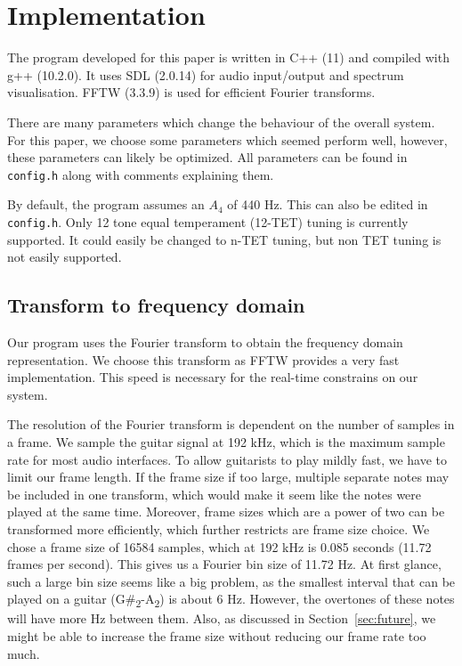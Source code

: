 \documentclass[10pt,twocolumn]{article}
\begin{document}
\section{Implementation}  \label{sec:impl}
The program developed for this paper is written in C++ (11) and compiled with g++ (10.2.0). It uses SDL (2.0.14) for audio input/output and spectrum visualisation. FFTW (3.3.9) is used for efficient Fourier transforms.

There are many parameters which change the behaviour of the overall system. For this paper, we choose some parameters which seemed perform well, however, these parameters can likely be optimized. All parameters can be found in \texttt{config.h} along with comments explaining them.

By default, the program assumes an $A_4$ of 440 Hz. This can also be edited in \texttt{config.h}. Only 12 tone equal temperament (12-TET) tuning is currently supported. It could easily be changed to n-TET tuning, but non TET tuning is not easily supported.

\subsection{Transform to frequency domain}  \label{sub:four}
Our program uses the Fourier transform to obtain the frequency domain representation. We choose this transform as FFTW provides a very fast implementation. This speed is necessary for the real-time constrains on our system.

The resolution of the Fourier transform is dependent on the number of samples in a frame. We sample the guitar signal at 192 kHz, which is the maximum sample rate for most audio interfaces. To allow guitarists to play mildly fast, we have to limit our frame length. If the frame size if too large, multiple separate notes may be included in one transform, which would make it seem like the notes were played at the same time. Moreover, frame sizes which are a power of two can be transformed more efficiently, which further restricts are frame size choice. We chose a frame size of 16584 samples, which at 192 kHz is 0.085 seconds (11.72 frames per second). This gives us a Fourier bin size of 11.72 Hz. At first glance, such a large bin size seems like a big problem, as the smallest interval that can be played on a guitar (G\#\textsubscript{2}-A\textsubscript{2}) is about 6 Hz. However, the overtones of these notes will have more Hz between them. Also, as discussed in Section~\ref{sec:future}, we might be able to increase the frame size without reducing our frame rate too much.
\end{document}
